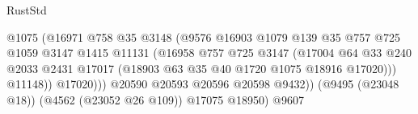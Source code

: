 \begin{lexlean}{RustStd}
\begin{coremodule}
                                              @1075
                                              (@16971
                                                @758
                                                @35
                                                @3148
                                                (@9576
                                                  @16903
                                                  @1079
                                                  @139
                                                  @35
                                                  @757
                                                  @725
                                                  @1059
                                                  @3147
                                                  @1415
                                                  @11131
                                                  (@16958
                                                    @757
                                                    @725
                                                    @3147
                                                    (@17004
                                                      @64
                                                      @33
                                                      @240
                                                      @2033
                                                      @2431
                                                      @17017
                                                      (@18903
                                                        @63
                                                        @35
                                                        @40
                                                        @1720
                                                        @1075
                                                        @18916
                                                        @17020)))
                                                  @11148))
                                              @17020)))
                                        @20590
                                        @20593
                                        @20596
                                        @20598
                                        @9432))
                                    (@9495 (@23048 @18))
                                    (@4562 (@23052 @26 @109))
                                    @17075
                                    @18950)
                                  @9607

\end{coremodule}
\end{lexlean}
